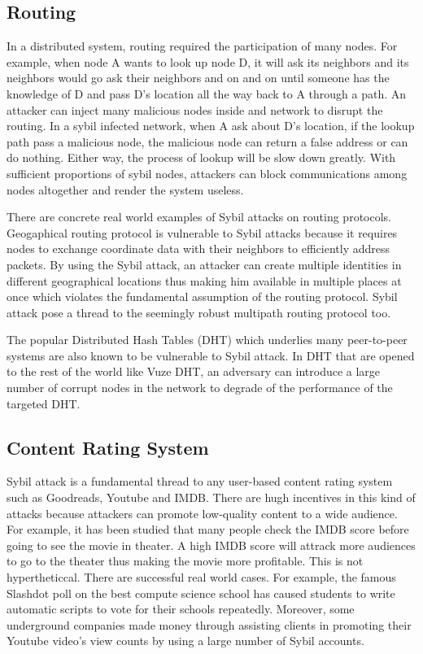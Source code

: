 \documentclass[conference]{IEEEtran}
\begin{document}
\subsection{Routing}
In a distributed system, routing required the participation of many nodes. For example, when node A wants to look up node D, it will ask its neighbors and its neighbors would go ask their neighbors and on and on until someone has the knowledge of D and pass D’s location all the way back to A through a path. An attacker can inject many malicious nodes inside and network to disrupt the routing. In a sybil infected network, when A ask about D’s location, if the lookup path pass a malicious node, the malicious node can return a false address or can do nothing. Either way, the process of lookup will be slow down greatly. With sufficient proportions of sybil nodes, attackers can block communications among nodes altogether and render the system useless.

There are concrete real world examples of Sybil attacks on routing protocols.
Geogaphical routing protocol is vulnerable to Sybil attacks because it requires nodes to exchange coordinate data with their neighbors to efficiently address packets. By using the Sybil attack, an attacker can create multiple identities in different geographical locations thus making him available in multiple places at once which violates the fundamental assumption of the routing protocol\cite{Karlof03securerouting}. Sybil attack pose a thread to the seemingly robust multipath routing protocol too.\cite{Karlof03securerouting}

The popular Distributed Hash Tables (DHT) which underlies many peer-to-peer systems are also known to be vulnerable to Sybil attack. In DHT that are opened to the rest of the world like Vuze DHT, an adversary can introduce a large number of corrupt nodes in the network to degrade of the performance of the targeted DHT.\cite{Danezis05sybil-resistantdht} 

\subsection{Content Rating System}
Sybil attack is a fundamental thread to any user-based content rating system such as Goodreads, Youtube and IMDB. There are hugh incentives in this kind of attacks because attackers can promote low-quality content to a wide audience. For example, it has been studied that many people check the IMDB score before going to see the movie in theater. A high IMDB score will attrack more audiences to go to the theater thus making the movie more profitable. This is not hypertheticcal. There are successful real world cases. For example, the famous Slashdot poll on the best compute science school has caused students to write automatic scripts to vote for their schools repeatedly. Moreover, some underground companies made money through assisting clients in promoting their Youtube video's view counts by using a large number of Sybil accounts.\cite{Tran09SOC}
\end{document}
